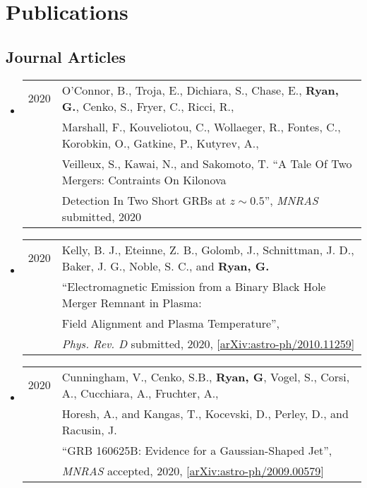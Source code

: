\section*{Publications}
\subsection*{Journal Articles}
\begin{itemize}

\item \begin{tabular}{ll}
2020 & {O'Connor}, B., {Troja}, E., {Dichiara}, S., {Chase}, E., {\bf {Ryan}, G.}, {Cenko}, S., {Fryer}, C., {Ricci}, R.,\\ 
	& {Marshall}, F., {Kouveliotou}, C., {Wollaeger}, R., {Fontes}, C., {Korobkin}, O., {Gatkine}, P., {Kutyrev}, A., \\
	& {Veilleux}, {S.}, {Kawai}, N., and {Sakomoto}, T. ``A Tale Of Two Mergers: Contraints On Kilonova\\
	&  Detection In Two Short GRBs at $z\!\sim\!0.5$'', \emph{MNRAS} submitted, 2020\\
\end{tabular}

\item \begin{tabular}{ll}
2020 & {Kelly}, B. J., {Eteinne}, Z. B., {Golomb}, J.,  {Schnittman}, J. D., {Baker}, J. G., {Noble}, S. C., and {\bf {Ryan}, G.} \\
	& ``Electromagnetic Emission from a Binary Black Hole Merger Remnant in Plasma:\\
	& Field Alignment and Plasma Temperature'',\\
	& \emph{Phys. Rev. D} submitted, 2020, [\href{https://arxiv.org/abs/2010.11259}{arXiv:astro-ph/2010.11259}]
\end{tabular}

\item \begin{tabular}{ll}
2020 & {Cunningham}, V., {Cenko}, S.B., {\bf {Ryan}, G}, {Vogel}, S., {Corsi}, A., {Cucchiara}, A., {Fruchter}, A.,\\
	& {Horesh}, A., and {Kangas}, T., {Kocevski}, D., {Perley}, D., and {Racusin}, J. \\
	& ``GRB 160625B: Evidence for a Gaussian-Shaped Jet'',\\
	& \emph{MNRAS} accepted, 2020, [\href{https://arxiv.org/abs/2009.00579}{arXiv:astro-ph/2009.00579}]
\end{tabular}


\end{itemize}
